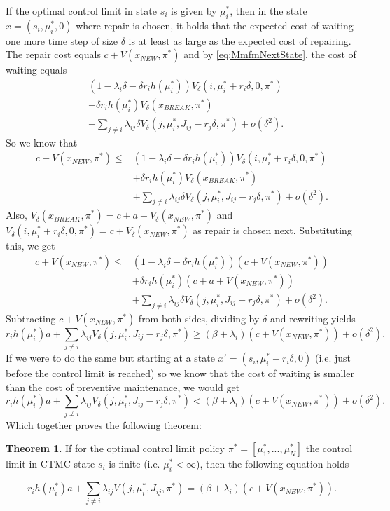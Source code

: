 \documentclass[a4paper]{thesis}
\theoremstyle{definition}
\newtheorem{theorem}{Theorem}[section]
\begin{document}
If the optimal control limit in state $s_i$ is given by $\mu_i^*$, then in the state $x=(s_i,\mu_i^*,0)$ where repair is chosen, it holds that the expected cost of waiting one more time step of size $\delta$ is at least as large as the expected cost of repairing.
The repair cost equals $c+V(x_{NEW},\pi^*)$ and by \eqref{eq:MmfmNextState}, the cost of waiting equals
\[
\begin{split}
&(1-\lambda_i \delta-\delta r_ih(\mu_i^*))V_\delta(i,\mu_i^*+r_i\delta,0,\pi^*)\\
&+ \delta r_ih(\mu_i^*)V_\delta(x_{BREAK},\pi^*)\\
&+\sum\limits_{j\neq i}\lambda_{ij} \delta V_\delta(j,\mu_i^*,J_{ij}-r_j\delta,\pi^*)+o(\delta^2).
\end{split}
\]
So we know that
\[
\begin{split}
c+V(x_{NEW},\pi^*)\leq 
&(1-\lambda_i \delta-\delta r_ih(\mu_i^*))V_\delta(i,\mu_i^*+r_i\delta,0,\pi^*)\\
&+ \delta r_ih(\mu_i^*)V_\delta(x_{BREAK},\pi^*)\\
&+\sum\limits_{j\neq i}\lambda_{ij} \delta V_\delta(j,\mu_i^*,J_{ij}-r_j\delta,\pi^*)+o(\delta^2).
\end{split}
\]
Also, $V_\delta(x_{BREAK},\pi^*)=c+a+V_\delta(x_{NEW},\pi^*)$ and $V_\delta(i,\mu_i^*+r_i\delta,0,\pi^*)=c+V_\delta(x_{NEW},\pi^*)$ as repair is chosen next.
Substituting this, we get
\[\begin{split}
c+V(x_{NEW},\pi^*)\leq
&(1-\lambda_i \delta-\delta r_ih(\mu_i^*))(c+V(x_{NEW},\pi^*))\\
&+ \delta r_ih(\mu_i^*)(c+a+V(x_{NEW},\pi^*))\\
&+\sum\limits_{j\neq i}\lambda_{ij} \delta V_\delta(j,\mu_i^*,J_{ij}-r_j\delta,\pi^*)+o(\delta^2).
\end{split}
\]
Subtracting $c+V(x_{NEW},\pi^*)$ from both sides, dividing by $\delta$ and rewriting yields
\[
r_ih(\mu_i^*)a+\sum\limits_{j\neq i}\lambda_{ij} V_\delta(j,\mu_i^*,J_{ij}-r_j\delta,\pi^*)\geq
(\beta+\lambda_i)(c+V(x_{NEW},\pi^*))+o(\delta^2).
\]
If we were to do the same but starting at a state $x'=(s_i,\mu_i^*-r_i\delta,0)$ (i.e. just before the control limit is reached) so we know that the cost of waiting is smaller than the cost of preventive maintenance, we would get
\[
r_ih(\mu_i^*)a+\sum\limits_{j\neq i}\lambda_{ij} V_\delta(j,\mu_i^*,J_{ij}-r_j\delta,\pi^*)<
(\beta+\lambda_i)(c+V(x_{NEW},\pi^*))+o(\delta^2).
\]
Which together proves the following theorem:
\begin{theorem}
	If for the optimal control limit policy $\pi^*=[\mu_1^*,...,\mu_N^*]$ the control limit in CTMC-state $s_i$ is finite (i.e. $\mu_i^*<\infty$), then the following equation holds 
	
	\begin{equation}\label{eq:MmfmHazardBounds}
	r_ih(\mu_i^*)a+\sum\limits_{j\neq i}\lambda_{ij} V(j,\mu_i^*,J_{ij},\pi^*)=
	(\beta+\lambda_i)(c+V(x_{NEW},\pi^*)).
	\end{equation}
\end{theorem}
\end{document}
